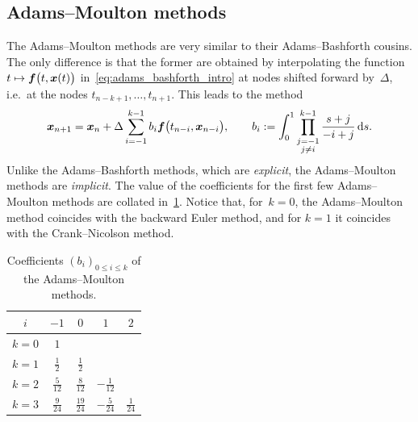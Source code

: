 \subsection{Adams--Moulton methods}
The Adams--Moulton methods are very similar to their Adams--Bashforth cousins.
The only difference is that the former are obtained by interpolating the function $t \mapsto \mathbf{\boldsymbol{f}}\bigl(t, \mathbf{\boldsymbol{x}}(t)\bigr)$ in~\eqref{eq:adams_bashforth_intro} at nodes shifted forward by~$\Delta$,
i.e.\ at the nodes $t_{n-k+1}, \dotsc, t_{n+1}$.
This leads to the method
\begin{equation}
    \label{eq:adams_moulton}
    \mathbf{\boldsymbol{x}}_{n+1} = \mathbf{\boldsymbol{x}}_n + \Delta \sum_{i=-1}^{k-1} b_i \mathbf{\boldsymbol{f}}\bigl(t_{n-i}, \mathbf{\boldsymbol{x}}_{n-i}\bigr),
    \qquad b_i := \int_{0}^{1} \prod_{\substack{j=-1 \\ j\neq i}}^{k-1} \frac{s + j}{-i + j} \, \mathrm d s.
\end{equation}
Unlike the Adams--Bashforth methods, which are \emph{explicit},
the Adams--Moulton methods are \emph{implicit}.
The value of the coefficients for the first few Adams--Moulton methods are collated in~\cref{table:adams_moulton}.
Notice that, for~$k = 0$, the Adams--Moulton method coincides with the backward Euler method,
and for $k =1$ it coincides with the Crank--Nicolson method.
\begin{table}[ht]
    \centering
    \begin{tabular}{|c|c|c|c|c|}
         \hline \phantom{$\Big($}
             $i$ & $-1$ & $0$ & $1$ & $2$
         \\ \hline \phantom{$\Big($}
             $k=0$ & $1$ & & &
         \\ \hline \phantom{$\Big($}
             $k=1$ & $\frac{1}{2}$ & $\frac{1}{2}$ & &
         \\ \hline \phantom{$\Big($}
             $k=2$ & $\frac{5}{12}$ & $\frac{8}{12}$ & $-\frac{1}{12}$ &
         \\ \hline \phantom{$\Big($}
             $k=3$ & $\frac{9}{24}$ & $\frac{19}{24}$ & $-\frac{5}{24}$ & $\frac{1}{24}$
         \\ \hline
    \end{tabular}
    \caption{%
        Coefficients $(b_i)_{0 \leq i \leq k}$ of the Adams--Moulton methods.
    }
    \label{table:adams_moulton}
\end{table}

